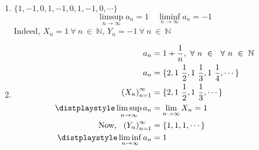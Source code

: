 \begin{example}
    \begin{enumerate}
        \item \(\{1, -1, 0, 1, -1, 0, 1, -1, 0, \cdots\}\)\\
        \[\displaystyle\limsup_{n\to\infty}a_n = 1 \quad \displaystyle\liminf_{n\to\infty}a_n = -1\]
        Indeed, \(X_n = 1 ~ \forall ~ n ~\in~ \mathbb N\), \(Y_n = -1~ \forall ~ n ~\in~ \mathbb N\)
        \item 
        \begin{align*}
            a_n &= 1 + \frac{1}{n}, ~\forall~ n ~\in~\mathbb~ \forall ~ n ~\in~ \mathbb N\\
            a_n &= \{2, 1~\frac{1}{2},1~\frac{1}{3}, 1~\frac{1}{4}, \cdots\}\\
            \left(X_n\right)_{n=1}^\infty &= \{2, 1~\frac{1}{2}, 1~\frac{1}{3}, \cdots\}\\
            \distplaystyle\limsup_{n\to\infty} a_n  &= \displaystyle\lim_{n\to\infty} X_n = 1\\
            \text{Now, }~ \left(Y_n\right)_{n=1}^\infty &= \{1, 1, 1, \cdots\}\\
            \distplaystyle\liminf_{n\to\infty} a_n  &=  1\\
        \end{align*}
    \end{enumerate}
\end{example}

